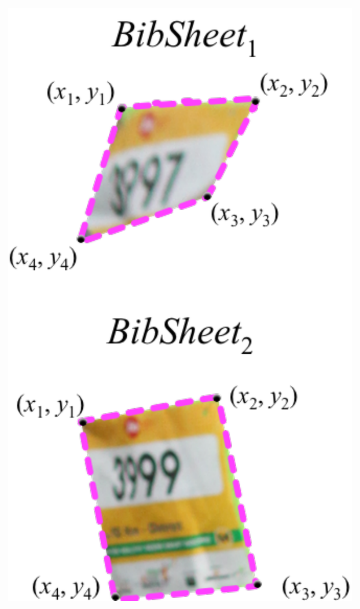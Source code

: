 \begin{figure}[p]
\begin{subfigure}[b]{0.25\textwidth}
  \end{subfigure}
  \hspace{\fill}
  \begin{subfigure}[b]{0.25\textwidth}
    \includegraphics[width=\textwidth]{images/dataset/BibSheet_Area}
  \end{subfigure}
  \begin{subfigure}[b]{0.25\textwidth}

\end{subfigure}
\end{figure}
